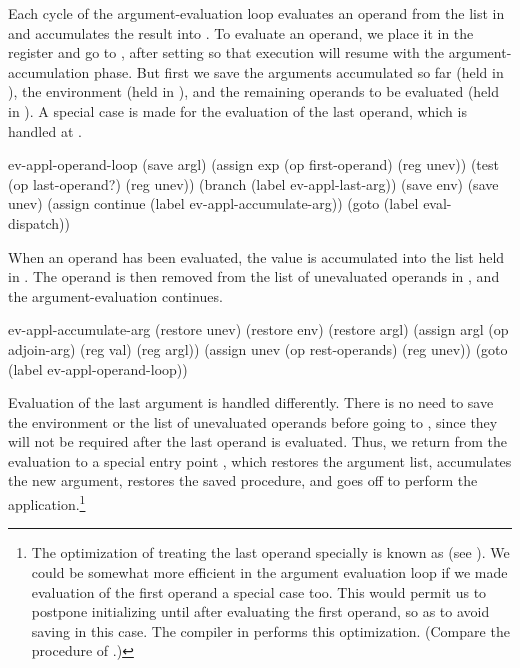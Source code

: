 \noindent
Each cycle of the argument-evaluation loop evaluates an operand from the list
in  and accumulates the result into .  To evaluate an
operand, we place it in the  register and go to ,
after setting  so that execution will resume with the
argument-accumulation phase.  But first we save the arguments accumulated so
far (held in ), the environment (held in ), and the
remaining operands to be evaluated (held in ).  A special case is
made for the evaluation of the last operand, which is handled at
.

\begin{codeBlock}
ev-appl-operand-loop
  (save argl)
  (assign exp (op first-operand) (reg unev))
  (test (op last-operand?) (reg unev))
  (branch (label ev-appl-last-arg))
  (save env)
  (save unev)
  (assign continue (label ev-appl-accumulate-arg))
  (goto (label eval-dispatch))
\end{codeBlock}

\noindent
When an operand has been evaluated, the value is accumulated into the list held
in .  The operand is then removed from the list of unevaluated
operands in , and the argument-evaluation continues.

\begin{codeBlock}
ev-appl-accumulate-arg
  (restore unev)
  (restore env)
  (restore argl)
  (assign argl (op adjoin-arg) (reg val) (reg argl))
  (assign unev (op rest-operands) (reg unev))
  (goto (label ev-appl-operand-loop))
\end{codeBlock}

\noindent
Evaluation of the last argument is handled differently.  There is no need to
save the environment or the list of unevaluated operands before going to
, since they will not be required after the last operand is
evaluated.  Thus, we return from the evaluation to a special entry point
, which restores the argument list, accumulates
the new argument, restores the saved procedure, and goes off to perform the
application.\footnote{The optimization of treating the last operand specially
is known as  (see ).  We could be
somewhat more efficient in the argument evaluation loop if we made evaluation
of the first operand a special case too.  This would permit us to postpone
initializing  until after evaluating the first operand, so as to
avoid saving  in this case.  The compiler in 
performs this optimization.  (Compare the  procedure of
.)}


